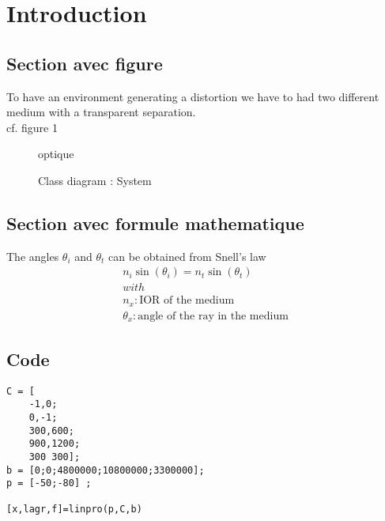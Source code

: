 \chapter*{Introduction}
\thispagestyle{fancy} 

\section{Section avec figure}
To have an environment generating a distortion we have to had two different medium with a transparent separation.\\
cf. figure 1
\begin{figure}
\centering
\caption{optique}
\end{figure}
\begin{landscape}
\begin{figure}
\centering
\caption{Class diagram : System}
\end{figure}
\end{landscape}

\section{Section avec formule mathematique}
The angles $\theta_{i}$ and $\theta_{t}$ can be obtained from Snell's law
\begin{displaymath}
\begin{array}{l}
n_{i}\sin(\theta_{i}) = n_{t}\sin(\theta_{t})\\
with\\
n_{x}: \text{IOR of the medium}\\
\theta_{x}: \text{angle of the ray in the medium}
\end{array}
\end{displaymath}

\section{Code}
\lstset{language=Matlab}
\begin{lstlisting}[frame=single]
C = [
	-1,0;
	0,-1;
	300,600;
	900,1200;
	300 300];
b = [0;0;4800000;10800000;3300000];
p = [-50;-80] ;

[x,lagr,f]=linpro(p,C,b)
\end{lstlisting}